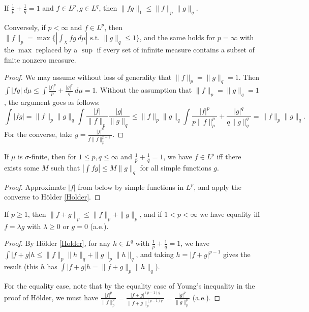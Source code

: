 \begin{thm}[H\"older]\label{Holder} If $\frac{1}{p} + \frac{1}{q} = 1$ and $f \in L^p, g \in L^q$, then $\|fg\|_1 \le \|f\|_p \|g\|_q$.

Conversely, if $p < \infty$ and $f \in L^p$, then $\|f\|_p = \max\{|\int_X fg\ d\mu| \text{ s.t. } \|g\|_q \le 1\}$, and the same holds for $p = \infty$ with the $\max$ replaced by a $\sup$ if every set of infinite measure contains a subset of finite nonzero measure.
\end{thm}
\begin{proof} We may assume without loss of generality that $\|f\|_p = \|g\|_q = 1$. Then $\int |fg|\ d\mu \le \int \frac{|f|^p}{p} + \frac{|g|^q}{q}\ d\mu = 1$. Without the assumption that $\|f\|_p = \|g\|_q = 1$, the argument goes as follows:
\[
\int |fg| = \|f\|_p\|g\|_q\int \frac{|f|}{\|f\|_p}\frac{|g|}{\|g\|_q} \le \|f\|_p\|g\|_q \int \frac{|f|^p}{p\|f\|_p^p} + \frac{|g|^q}{q\|g\|_q^q} = \|f\|_p\|g\|_q.
\]
For the converse, take $g = \frac{|f|^p}{f\|f\|_p^{p-1}}$.
\end{proof}

\begin{cor} If $\mu$ is $\sigma$-finite, then for $1 \le p,q \le \infty$ and $\frac{1}{p} + \frac{1}{q} = 1$, we have $f \in L^p$ iff there exists some $M$ such that $|\int fg| \le M\|g\|_q$ for all simple functions $g$.
\end{cor}
\begin{proof} Approximate $|f|$ from below by simple functions in $L^p$, and apply the converse to H\"older \ref{Holder}.
\end{proof}

\begin{thm}[Minkowski]\label{Minkowski} If $p \ge 1$, then $\|f+g\|_p \le \|f\|_p + \|g\|_p$, and if $1 < p < \infty$ we have equality iff $f = \lambda g$ with $\lambda \ge 0$ or $g = 0$ (a.e.).
\end{thm}
\begin{proof} By H\"older \ref{Holder}, for any $h \in L^q$ with $\frac{1}{p} + \frac{1}{q} = 1$, we have $\int |f+g|h \le \|f\|_p\|h\|_q + \|g\|_p\|h\|_q$, and taking $h = |f+g|^{p-1}$ gives the result (this $h$ has $\int |f+g|h = \|f+g\|_p\|h\|_q$).

For the equality case, note that by the equality case of Young's inequality in the proof of H\"older, we must have $\frac{|f|^p}{\|f\|_p^p} = \frac{|f+g|^{(p-1)q}}{\|f+g\|_p^{(p-1)q}} = \frac{|g|^p}{\|g\|_p^p}$ (a.e.).
\end{proof}


